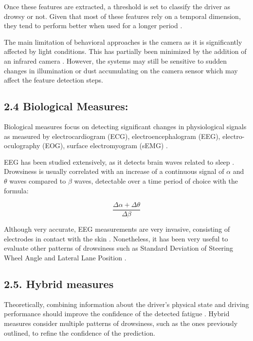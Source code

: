 \documentclass[a4paper, 12pt]{extarticle}
\begin{document}
Once these features are extracted, a threshold is set to classify the
driver as drowsy or not. Given that most of these features rely on a
temporal dimension, they tend to perform better when used for a longer
period \cite{wilkinson_accuracy_2013}.

The main limitation of behavioral approaches is the camera as it is
significantly affected by light conditions. This has partially been
minimized by the addition of an infrared camera
\cite{sahayadhas_detecting_2012}. However, the systems may still be
sensitive to sudden changes in illumination or dust accumulating on the
camera sensor which may affect the feature detection steps.

\hypertarget{biological-measures}{%
\subsection{2.4 Biological Measures:}\label{biological-measures}}

Biological measures focus on detecting significant changes in
physiological signals as measured by electrocardiogram (ECG),
electroencephalogram (EEG), electro-oculography (EOG), surface
electromyogram (sEMG) \cite{dong_driver_2011}.

EEG has been studied extensively, as it detects brain waves related to
sleep \cite{qiong_wang_driver_2006}. Drowsiness is usually correlated
with an increase of a continuous signal of \(\alpha\) and \(\theta\)
waves compared to \(\beta\) waves, detectable over a time period of choice with the formula:

\[ \dfrac{\Delta \alpha + \Delta \theta}{\Delta \beta} \]

Although very accurate, EEG measurements are very invasive, consisting
of electrodes in contact with the skin \cite{dong_driver_2011}.
Nonetheless, it has been very useful to evaluate other patterns of
drowsiness such as Standard Deviation of Steering Wheel Angle and
Lateral Lane Position \cite{boyle_driver_2008}.

\hypertarget{hybrid-measures}{%
\subsection{2.5. Hybrid measures}\label{hybrid-measures}}

Theoretically, combining information about the driver's physical state
and driving performance should improve the confidence of the detected
fatigue \cite{dong_driver_2011}. Hybrid measures consider multiple
patterns of drowsiness, such as the ones previously outlined, to refine
the confidence of the prediction.
\end{document}
